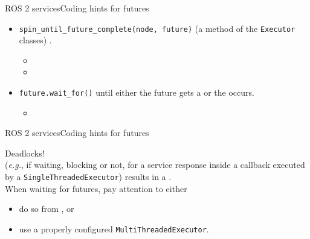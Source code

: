 \begin{frame}{ROS 2 services}{Coding hints for futures}
  \justifying
  \begin{itemize}
    \item \texttt{spin\_until\_future\_complete(node, future)} (a method of the \texttt{Executor} classes) .
      \begin{itemize}
        \item {}
        \item {}
      \end{itemize}
    \item \texttt{future.wait\_for()}  until either the future gets a  or the  occurs.
      \begin{itemize}
        \item {}
      \end{itemize}
  \end{itemize}
\end{frame}
\begin{frame}{ROS 2 services}{Coding hints for futures}
  \begin{alertblock}{Deadlocks!}
    \justifying
    \\
    \medskip
     (\emph{e.g.}, if waiting, blocking or not, for a service response inside a callback executed by a \texttt{SingleThreadedExecutor}) results in a .\\
    \medskip
    When waiting for futures, pay attention to either
    \begin{itemize}
      \item do so from , or
      \item use a properly configured \texttt{MultiThreadedExecutor}.
    \end{itemize}
  \end{alertblock}
\end{frame}

